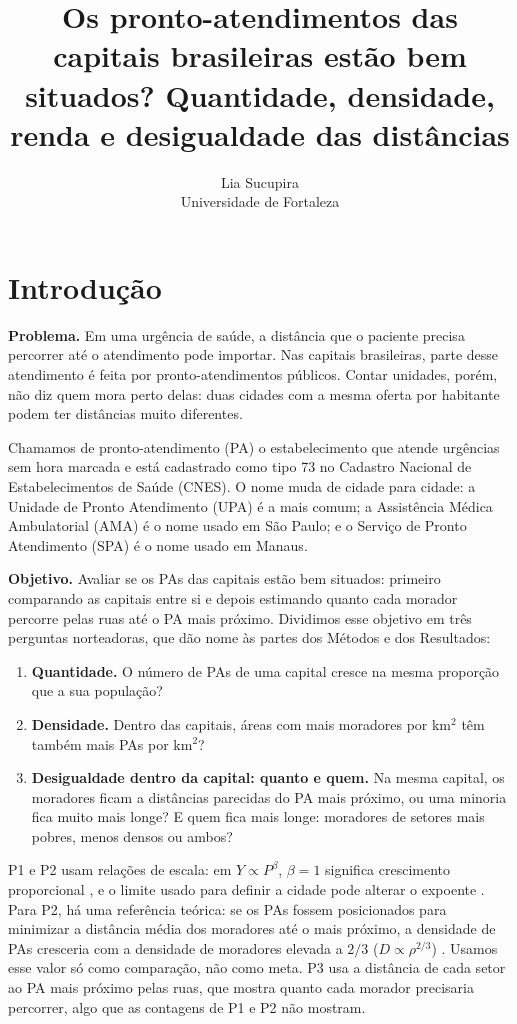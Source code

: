\documentclass[10pt,a4paper,twocolumn]{article}
\title{\vspace{-1.4em}\large\bfseries Os pronto-atendimentos das capitais brasileiras est\~ao bem situados? Quantidade, densidade, renda e desigualdade das dist\^ancias}
\author{\normalsize Lia Sucupira\\[-1pt]\small Universidade de Fortaleza}
\date{}
\begin{document}
\maketitle
\vspace{-1.2em}

\section{Introdução}
\textbf{Problema.} Em uma urgência de saúde, a distância que o paciente precisa percorrer até o atendimento pode importar. Nas capitais brasileiras, parte desse atendimento é feita por pronto-atendimentos públicos. Contar unidades, porém, não diz quem mora perto delas: duas cidades com a mesma oferta por habitante podem ter distâncias muito diferentes.

Chamamos de pronto-atendimento (PA) o estabelecimento que atende urgências sem hora marcada e está cadastrado como tipo 73 no Cadastro Nacional de Estabelecimentos de Saúde (CNES). O nome muda de cidade para cidade: a Unidade de Pronto Atendimento (UPA) é a mais comum; a Assistência Médica Ambulatorial (AMA) é o nome usado em São Paulo; e o Serviço de Pronto Atendimento (SPA) é o nome usado em Manaus.

\textbf{Objetivo.} Avaliar se os PAs das capitais estão bem situados: primeiro comparando as capitais entre si e depois estimando quanto cada morador percorre pelas ruas até o PA mais próximo. Dividimos esse objetivo em três perguntas norteadoras, que dão nome às partes dos Métodos e dos Resultados:
\begin{enumerate}\itemsep0pt
\item[P1.] \textbf{Quantidade.} O número de PAs de uma capital cresce na mesma proporção que a sua população?
\item[P2.] \textbf{Densidade.} Dentro das capitais, áreas com mais moradores por km$^2$ têm também mais PAs por km$^2$?
\item[P3.] \textbf{Desigualdade dentro da capital: quanto e quem.} Na mesma capital, os moradores ficam a distâncias parecidas do PA mais próximo, ou uma minoria fica muito mais longe? E quem fica mais longe: moradores de setores mais pobres, menos densos ou ambos?
\end{enumerate}
P1 e P2 usam relações de escala: em $Y\propto P^{\beta}$, $\beta=1$ significa crescimento proporcional \citep{bettencourt2021}, e o limite usado para definir a cidade pode alterar o expoente \citep{arcaute2015}. Para P2, há uma referência teórica: se os PAs fossem posicionados para minimizar a distância média dos moradores até o mais próximo, a densidade de PAs cresceria com a densidade de moradores elevada a $2/3$ ($D\propto\rho^{2/3}$) \citep{gastner2006}. Usamos esse valor só como comparação, não como meta. P3 usa a distância de cada setor ao PA mais próximo pelas ruas, que mostra quanto cada morador precisaria percorrer, algo que as contagens de P1 e P2 não mostram.
\end{document}

